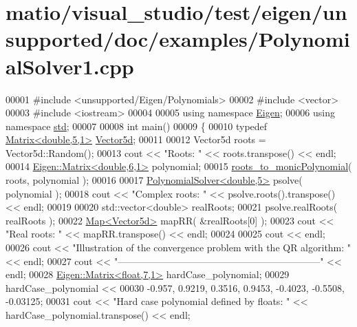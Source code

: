 \hypertarget{matio_2visual__studio_2test_2eigen_2unsupported_2doc_2examples_2_polynomial_solver1_8cpp_source}{}\section{matio/visual\+\_\+studio/test/eigen/unsupported/doc/examples/\+Polynomial\+Solver1.cpp}
\label{matio_2visual__studio_2test_2eigen_2unsupported_2doc_2examples_2_polynomial_solver1_8cpp_source}

\begin{DoxyCode}
00001 \textcolor{preprocessor}{#include <unsupported/Eigen/Polynomials>}
00002 \textcolor{preprocessor}{#include <vector>}
00003 \textcolor{preprocessor}{#include <iostream>}
00004 
00005 \textcolor{keyword}{using namespace }\hyperlink{namespace_eigen}{Eigen};
00006 \textcolor{keyword}{using namespace }\hyperlink{namespacestd}{std};
00007 
00008 \textcolor{keywordtype}{int} main()
00009 \{
00010   \textcolor{keyword}{typedef} \hyperlink{group___core___module_class_eigen_1_1_matrix}{Matrix<double,5,1>} \hyperlink{group___core___module_class_eigen_1_1_matrix}{Vector5d};
00011 
00012   Vector5d roots = Vector5d::Random();
00013   cout << \textcolor{stringliteral}{"Roots: "} << roots.transpose() << endl;
00014   \hyperlink{group___core___module_class_eigen_1_1_matrix}{Eigen::Matrix<double,6,1>} polynomial;
00015   \hyperlink{namespace_eigen_afbc3648f7ef67db3d5d04454fc1257fd}{roots\_to\_monicPolynomial}( roots, polynomial );
00016 
00017   \hyperlink{class_eigen_1_1_polynomial_solver}{PolynomialSolver<double,5>} psolve( polynomial );
00018   cout << \textcolor{stringliteral}{"Complex roots: "} << psolve.roots().transpose() << endl;
00019 
00020   std::vector<double> realRoots;
00021   psolve.realRoots( realRoots );
00022   \hyperlink{group___core___module_class_eigen_1_1_map}{Map<Vector5d>} mapRR( &realRoots[0] );
00023   cout << \textcolor{stringliteral}{"Real roots: "} << mapRR.transpose() << endl;
00024 
00025   cout << endl;
00026   cout << \textcolor{stringliteral}{"Illustration of the convergence problem with the QR algorithm: "} << endl;
00027   cout << \textcolor{stringliteral}{"---------------------------------------------------------------"} << endl;
00028   \hyperlink{group___core___module_class_eigen_1_1_matrix}{Eigen::Matrix<float,7,1>} hardCase\_polynomial;
00029   hardCase\_polynomial <<
00030   -0.957, 0.9219, 0.3516, 0.9453, -0.4023, -0.5508, -0.03125;
00031   cout << \textcolor{stringliteral}{"Hard case polynomial defined by floats: "} << hardCase\_polynomial.transpose() << endl;

\end{DoxyCode}

